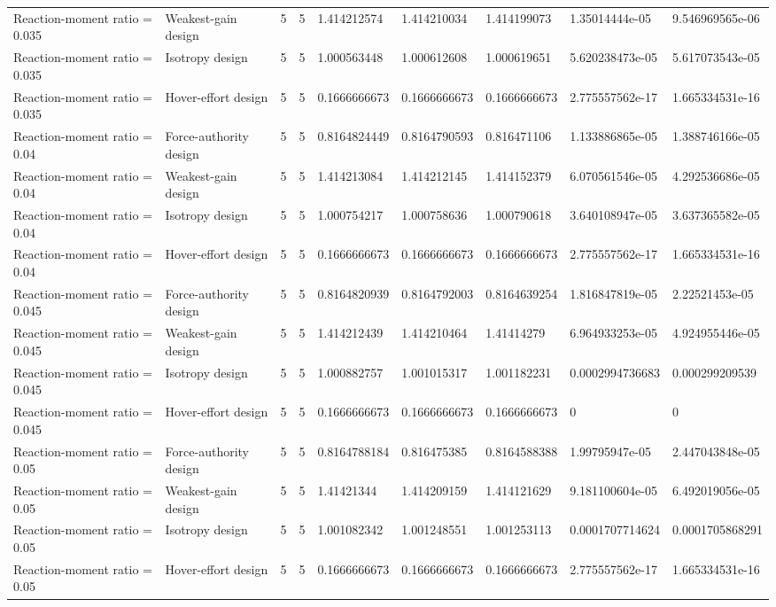 \begin{tabular}{@{}lllllllll@{}}
Reaction-moment ratio = 0.035 & Weakest-gain design & 5 & 5 & 1.414212574 & 1.414210034 & 1.414199073 & 1.35014444e-05 & 9.546969565e-06 \\
Reaction-moment ratio = 0.035 & Isotropy design & 5 & 5 & 1.000563448 & 1.000612608 & 1.000619651 & 5.620238473e-05 & 5.617073543e-05 \\
Reaction-moment ratio = 0.035 & Hover-effort design & 5 & 5 & 0.1666666673 & 0.1666666673 & 0.1666666673 & 2.775557562e-17 & 1.665334531e-16 \\
Reaction-moment ratio = 0.04 & Force-authority design & 5 & 5 & 0.8164824449 & 0.8164790593 & 0.816471106 & 1.133886865e-05 & 1.388746166e-05 \\
Reaction-moment ratio = 0.04 & Weakest-gain design & 5 & 5 & 1.414213084 & 1.414212145 & 1.414152379 & 6.070561546e-05 & 4.292536686e-05 \\
Reaction-moment ratio = 0.04 & Isotropy design & 5 & 5 & 1.000754217 & 1.000758636 & 1.000790618 & 3.640108947e-05 & 3.637365582e-05 \\
Reaction-moment ratio = 0.04 & Hover-effort design & 5 & 5 & 0.1666666673 & 0.1666666673 & 0.1666666673 & 2.775557562e-17 & 1.665334531e-16 \\
Reaction-moment ratio = 0.045 & Force-authority design & 5 & 5 & 0.8164820939 & 0.8164792003 & 0.8164639254 & 1.816847819e-05 & 2.22521453e-05 \\
Reaction-moment ratio = 0.045 & Weakest-gain design & 5 & 5 & 1.414212439 & 1.414210464 & 1.41414279 & 6.964933253e-05 & 4.924955446e-05 \\
Reaction-moment ratio = 0.045 & Isotropy design & 5 & 5 & 1.000882757 & 1.001015317 & 1.001182231 & 0.0002994736683 & 0.000299209539 \\
Reaction-moment ratio = 0.045 & Hover-effort design & 5 & 5 & 0.1666666673 & 0.1666666673 & 0.1666666673 & 0 & 0 \\
Reaction-moment ratio = 0.05 & Force-authority design & 5 & 5 & 0.8164788184 & 0.816475385 & 0.8164588388 & 1.99795947e-05 & 2.447043848e-05 \\
Reaction-moment ratio = 0.05 & Weakest-gain design & 5 & 5 & 1.41421344 & 1.414209159 & 1.414121629 & 9.181100604e-05 & 6.492019056e-05 \\
Reaction-moment ratio = 0.05 & Isotropy design & 5 & 5 & 1.001082342 & 1.001248551 & 1.001253113 & 0.0001707714624 & 0.0001705868291 \\
Reaction-moment ratio = 0.05 & Hover-effort design & 5 & 5 & 0.1666666673 & 0.1666666673 & 0.1666666673 & 2.775557562e-17 & 1.665334531e-16 \\

\end{tabular}
